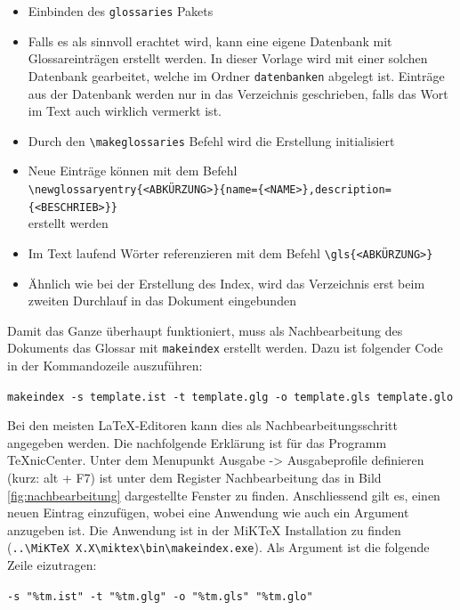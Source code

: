 \begin{itemize}
	\item Einbinden des \texttt{glossaries} Pakets
	\item Falls es als sinnvoll erachtet wird, kann eine eigene Datenbank mit Glossareinträgen erstellt werden. In dieser Vorlage wird mit einer solchen Datenbank gearbeitet, welche im Ordner \texttt{datenbanken} abgelegt ist. Einträge aus der Datenbank werden nur in das Verzeichnis geschrieben, falls das Wort im Text auch wirklich vermerkt ist.
	\item Durch den \texttt{\textbackslash makeglossaries} Befehl wird die Erstellung initialisiert
	\item Neue Einträge können mit dem Befehl \\ \texttt{\textbackslash newglossaryentry\{<ABKÜRZUNG>\}\{name=\{<NAME>\},description=\{<BESCHRIEB>\}\}} \\ erstellt werden
	\item Im Text laufend Wörter referenzieren mit dem Befehl \texttt{\textbackslash gls\{<ABKÜRZUNG>\}}
	\item Ähnlich wie bei der Erstellung des Index, wird das Verzeichnis erst beim zweiten Durchlauf in das Dokument eingebunden
\end{itemize}

Damit das Ganze überhaupt funktioniert, muss als Nachbearbeitung des Dokuments das Glossar mit \texttt{makeindex} erstellt werden. Dazu ist folgender Code in der Kommandozeile auszuführen:

\begin{center}
	\texttt{makeindex -s template.ist -t template.glg -o template.gls template.glo}
\end{center}

Bei den meisten \LaTeX -Editoren kann dies als Nachbearbeitungsschritt angegeben werden. Die nachfolgende Erklärung ist für das Programm TeXnicCenter. Unter dem Menupunkt \glqq Ausgabe\grqq{} -> \glqq Ausgabeprofile definieren\grqq{} (kurz: alt + F7) ist unter dem Register \glqq Nachbearbeitung\grqq{} das in Bild \ref{fig:nachbearbeitung} dargestellte Fenster zu finden. Anschliessend gilt es, einen neuen Eintrag einzufügen, wobei eine Anwendung wie auch ein Argument anzugeben ist. Die Anwendung ist in der MiKTeX Installation zu finden (\texttt{..\textbackslash MiKTeX X.X\textbackslash miktex\textbackslash bin\textbackslash makeindex.exe}). Als Argument ist die folgende Zeile eizutragen:

\begin{center}
	\texttt{-s \string"\%tm.ist\string" -t \string"\%tm.glg\string" -o \string"\%tm.gls\string" \string"\%tm.glo\string" }
\end{center}

